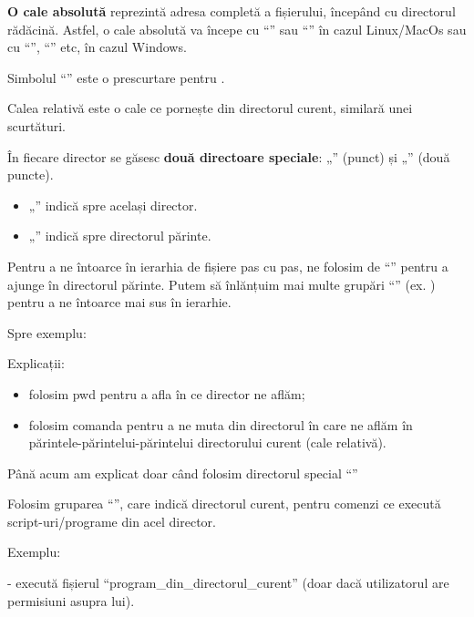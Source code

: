 \textbf{O cale absolută} reprezintă adresa completă a fișierului, începând cu
directorul rădăcină. Astfel, o cale absolută va începe cu “\file{/}” sau
“\file{\textasciitilde{}}” în cazul Linux/MacOs sau cu “”, “”
etc, în cazul Windows.

Simbolul “\file{\textasciitilde{}}” este o prescurtare pentru .

Calea relativă este o cale ce pornește din directorul curent, similară unei scurtături.

În fiecare director se găsesc \textbf{două directoare speciale}: „”
(punct) și „” (două puncte).

\begin{itemize}
	\item „” indică spre același director.
	\item „” indică spre directorul părinte.
\end{itemize}

Pentru a ne întoarce în ierarhia de fișiere pas cu pas, ne folosim de
“” pentru a ajunge în directorul părinte. Putem să înlănțuim mai multe
grupări “” (ex. ) pentru a ne întoarce mai sus în
ierarhie.

Spre exemplu:


Explicații:

\begin{itemize}
	\item folosim pwd pentru a afla în ce director ne aflăm;
	\item folosim comanda  pentru a ne muta din directorul
		în care ne aflăm în părintele-părintelui-părintelui directorului
		curent (cale relativă).
\end{itemize}

Până acum am explicat doar când folosim directorul special “”

Folosim gruparea “”, care indică directorul curent, pentru comenzi ce
execută script-uri/programe din acel director.

Exemplu:

 - execută fișierul
“program_din_directorul_curent” (doar dacă utilizatorul are permisiuni asupra
lui).

